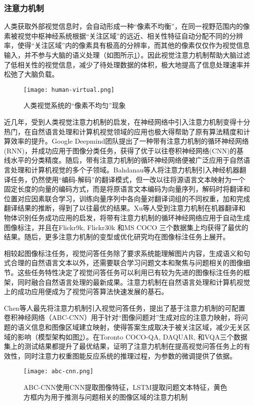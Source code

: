 \subsubsection{注意力机制}
人类获取外部视觉信息时，会自动形成一种“像素不均衡”，在同一视野范围内的像素被视觉中枢神经系统根据“关注区域”的远近、相关性特征自动分配不同的分辨率，使得“关注区域”内的像素具有极高的分辨率，而其他的像素仅仅作为视觉信息输入，并不参与大脑的语义处理（如图所示\ref{human-virtual}）。因此视觉注意力机制帮助大脑过滤了低相关性的视觉信息，减少了待处理数据的体积，极大地提高了信息处理速率并松弛了大脑负载。
\begin{figure}[H]
	\centering
	\texttt{[image: human-virtual.png]}
	\caption{人类视觉系统的“像素不均匀”现象}
	\label{human-virtual}
\end{figure}

近几年，受到人类视觉注意力机制的启发，在神经网络中引入注意力机制变得十分热门，在自然语言处理和计算机视觉领域的应用也极大得帮助了原有算法精度和计算效率的提升。Google Deepmind团队提出了一种带有注意力机制的循环神经网络(RNN)，并成功应用于图像分类任务，获得了优于以往卷积神经网络(CNN)的基线水平的分类精度。随后，带有注意力机制的循环神经网络便被广泛应用于自然语言处理和计算机视觉的多个子领域。Bahdanau等人将注意力机制引入神经机器翻译任务，仍然使用“编码-解码”的翻译模式，但一改以往将源语言文本映射为一个固定长度的向量的编码方式，而是将原语言文本编码为向量序列，解码时将翻译和位置对应因素联合学习，训练向量序列中各向量对翻译词组的不同权重，加和完成翻译结果的推断，得到了以往最优的结果。Xu等人受到注意力机制在机器翻译和物体识别任务成功应用的启发，将带有注意力机制的循环神经网络应用于自动生成图像标注，并且在Flickr9k, Flickr30k 和MS COCO 三个数据集上均获得了最优的结果。随后，更多注意力机制的变型或优化研究均在图像标注任务上展开。

相较起图像标注任务，视觉问答任务除了要求系统能理解图片内容，生成语义和句式合理的自然语言文本以外，还需要联合学习问题文本和聚焦与问题相关的图像细节。这些任务特性决定了视觉问答任务可以利用已有较为先进的图像标注任务的框架，同时融合自然语言处理的最新成果。注意力机制在自然语言处理和计算机视觉上的成功应用便成为了视觉问答算法快速发展的基石。

Chen等人最先将注意力机制引入视觉问答任务，提出了基于注意力机制的可配置卷积神经网络（ABC-CNN）用于针对“图像问题对”生成对应的注意力映射，将问题的语义信息和图像区域建立映射，使得答案生成取决于被关注区域，减少无关区域的影响（模型架构如图\ref{abc-cnn}）。在Toronto COCO-QA, DAQUAR, 和VQA三个数据集上的测试结果都提升了最优结果，证明了注意力机制在提高视觉问答任务上的有效性，同时注意力权重图能反应系统的推理过程，为参数的微调提供了依据。
\begin{figure}[H]
	\centering
	\texttt{[image: abc-cnn.png]}
	\caption{ABC-CNN使用CNN提取图像特征，LSTM提取问题文本特征，黄色方框内为用于推测与问题相关的图像区域的注意力机制}
	\label{abc-cnn}
\end{figure}

